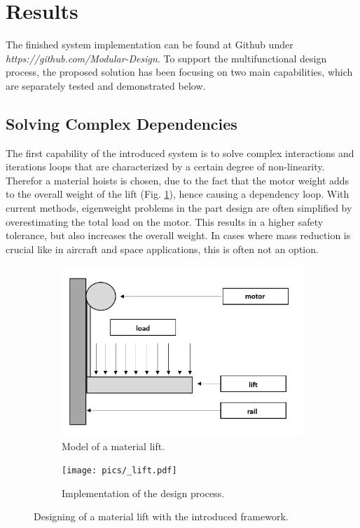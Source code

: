 \section{Results}
The finished system implementation can be found at Github under \emph{https://github.com/Modular-Design}.
To support the multifunctional design process, the proposed solution has been focusing on two main capabilities,
which are separately tested and demonstrated below.
\subsection{Solving Complex Dependencies}
The first capability of the introduced system is 
to solve complex interactions and iterations loops that are characterized by a certain degree of non-linearity.
Therefor a material hoists is chosen, due to the fact that the motor weight adds 
to the overall weight of the lift (Fig. \ref{pic:lift_model}), 
hence causing a dependency loop.
With current methods, eigenweight problems in the part design are often simplified 
by overestimating the total load on the motor.
This results in a higher safety tolerance, but also increases the overall weight.
In cases where mass reduction is crucial like in aircraft and space applications, this is often not an option.
\begin{figure}[h]
    \centering
    \begin{subfigure}[b]{0.55\textwidth}
        \centering
        \includegraphics[width=\textwidth]{pics/500Z_model.png}
        \caption{\label{pic:lift_model} Model of a material lift.}
    \end{subfigure}
    \hfill
    \begin{subfigure}[b]{0.95\textwidth}
        \centering
        \texttt{[image: pics/\_lift.pdf]}
        \caption{\label{pic:lift_solu} Implementation of the design process.}
    \end{subfigure}
    \caption{\label{pic:lift} Designing of a material lift with the introduced framework.}
\end{figure}\\
